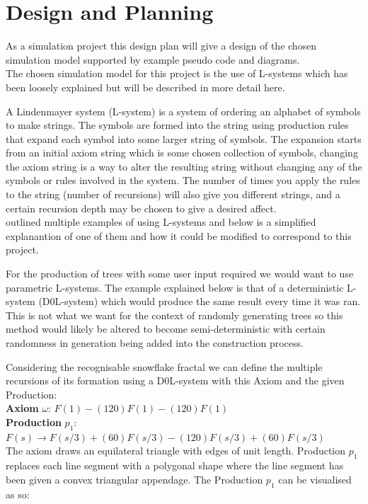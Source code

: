 \documentclass[progress]{cmpreport}
\begin{document}
\section{Design and Planning}
As a simulation project this design plan will give a design of the chosen simulation model 
supported by example pseudo code and diagrams.\\

The chosen simulation model for this project is the use of L-systems which has been loosely 
explained but will be described in more detail here.

A Lindenmayer system (L-system) is a system of ordering an alphabet of symbols to make 
strings. The symbols are formed into the string using production rules that expand each 
symbol into some larger string of symbols. The expansion starts from an initial axiom string 
which is some chosen collection of symbols, changing the axiom string is a way to alter the 
resulting string without changing any of the symbols or rules involved in the system. The 
number of times you apply the rules to the string (number of recursions) will also give you 
different strings, and a certain recursion depth may be chosen to give a desired affect.\\

\cite{prusinkiewicz1996systems} outlined multiple examples of using L-systems and below is 
a simplified explanantion of one of them and how it could be modified to correspond to this 
project.

For the production of trees with some user input required we would want to use parametric 
L-systems. The example explained below is that of a deterministic L-system (D0L-system) which 
would produce the same result every time it was ran. This is not what we want for the context 
of randomly generating trees so this method would likely be altered to become semi-deterministic 
with certain randomness in generation being added into the construction process. 

Considering the recognisable snowflake fractal we can define the multiple recursions of its 
formation using a D0L-system with this Axiom and the given Production: \\

\textbf{Axiom} $\omega$: $F(1) - (120)F(1) - (120)F(1)$ \\
\indent \textbf{Production} $p_1$: $F(s) \rightarrow F(s/3) + (60)F(s/3) - (120)F(s/3) + (60)F(s/3)$ \\

The axiom draws an equilateral triangle with edges of unit length. Production $p_1$ replaces 
each line segment with a polygonal shape where the line segment has been given a convex 
triangular appendage. The Production $p_1$ can be visualised as so:
\end{document}
